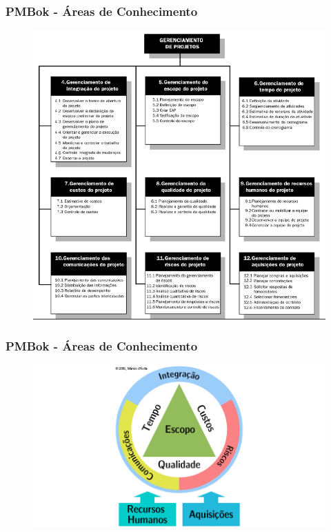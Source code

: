         \begin{frame}
 \frametitle{PMBok - Áreas de  Conhecimento}
 \begin{figure}
  \centering
  \includegraphics[height = \textheight]{figs/fig_proj7.png}
 \end{figure}
\end{frame}

      \begin{frame}
 \frametitle{PMBok - Áreas de  Conhecimento}
 \begin{figure}
  \centering
  \includegraphics[width = \textwidth]{figs/fig13.png}
 \end{figure}
\end{frame}




